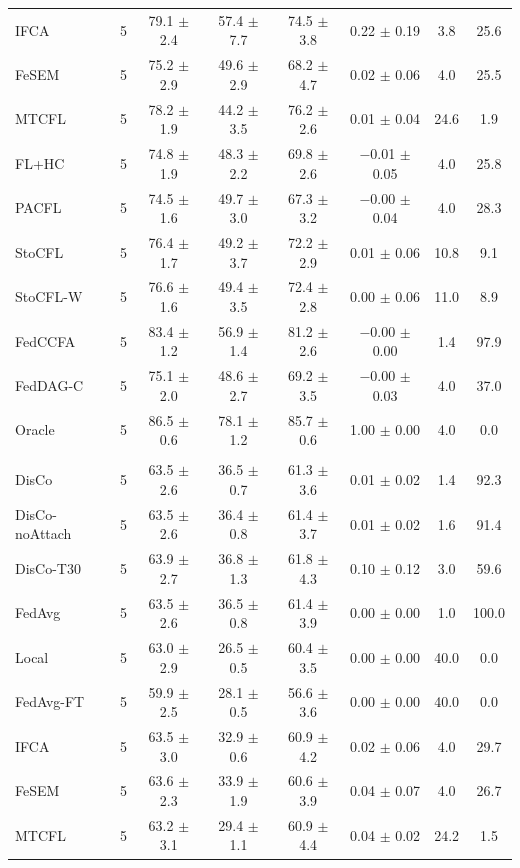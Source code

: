 {{\begin{tabular}{l r c c c c c c}
IFCA & 5 & 79.1 $\pm$ 2.4 & 57.4 $\pm$ 7.7 & 74.5 $\pm$ 3.8 & 0.22 $\pm$ 0.19 & 3.8 & 25.6 \\
FeSEM & 5 & 75.2 $\pm$ 2.9 & 49.6 $\pm$ 2.9 & 68.2 $\pm$ 4.7 & 0.02 $\pm$ 0.06 & 4.0 & 25.5 \\
MTCFL & 5 & 78.2 $\pm$ 1.9 & 44.2 $\pm$ 3.5 & 76.2 $\pm$ 2.6 & 0.01 $\pm$ 0.04 & 24.6 & 1.9 \\
FL+HC & 5 & 74.8 $\pm$ 1.9 & 48.3 $\pm$ 2.2 & 69.8 $\pm$ 2.6 & $-$0.01 $\pm$ 0.05 & 4.0 & 25.8 \\
PACFL & 5 & 74.5 $\pm$ 1.6 & 49.7 $\pm$ 3.0 & 67.3 $\pm$ 3.2 & $-$0.00 $\pm$ 0.04 & 4.0 & 28.3 \\
StoCFL & 5 & 76.4 $\pm$ 1.7 & 49.2 $\pm$ 3.7 & 72.2 $\pm$ 2.9 & 0.01 $\pm$ 0.06 & 10.8 & 9.1 \\
StoCFL-W & 5 & 76.6 $\pm$ 1.6 & 49.4 $\pm$ 3.5 & 72.4 $\pm$ 2.8 & 0.00 $\pm$ 0.06 & 11.0 & 8.9 \\
FedCCFA & 5 & 83.4 $\pm$ 1.2 & 56.9 $\pm$ 1.4 & 81.2 $\pm$ 2.6 & $-$0.00 $\pm$ 0.00 & 1.4 & 97.9 \\
FedDAG-C & 5 & 75.1 $\pm$ 2.0 & 48.6 $\pm$ 2.7 & 69.2 $\pm$ 3.5 & $-$0.00 $\pm$ 0.03 & 4.0 & 37.0 \\
Oracle & 5 & 86.5 $\pm$ 0.6 & 78.1 $\pm$ 1.2 & 85.7 $\pm$ 0.6 & 1.00 $\pm$ 0.00 & 4.0 & 0.0 \\
\addlinespace
\multicolumn{8}{l}{\textit{CIFAR-10 rotation}} \\
DisCo & 5 & 63.5 $\pm$ 2.6 & 36.5 $\pm$ 0.7 & 61.3 $\pm$ 3.6 & 0.01 $\pm$ 0.02 & 1.4 & 92.3 \\
DisCo-noAttach & 5 & 63.5 $\pm$ 2.6 & 36.4 $\pm$ 0.8 & 61.4 $\pm$ 3.7 & 0.01 $\pm$ 0.02 & 1.6 & 91.4 \\
DisCo-T30 & 5 & 63.9 $\pm$ 2.7 & 36.8 $\pm$ 1.3 & 61.8 $\pm$ 4.3 & 0.10 $\pm$ 0.12 & 3.0 & 59.6 \\
FedAvg & 5 & 63.5 $\pm$ 2.6 & 36.5 $\pm$ 0.8 & 61.4 $\pm$ 3.9 & 0.00 $\pm$ 0.00 & 1.0 & 100.0 \\
Local & 5 & 63.0 $\pm$ 2.9 & 26.5 $\pm$ 0.5 & 60.4 $\pm$ 3.5 & 0.00 $\pm$ 0.00 & 40.0 & 0.0 \\
FedAvg-FT & 5 & 59.9 $\pm$ 2.5 & 28.1 $\pm$ 0.5 & 56.6 $\pm$ 3.6 & 0.00 $\pm$ 0.00 & 40.0 & 0.0 \\
IFCA & 5 & 63.5 $\pm$ 3.0 & 32.9 $\pm$ 0.6 & 60.9 $\pm$ 4.2 & 0.02 $\pm$ 0.06 & 4.0 & 29.7 \\
FeSEM & 5 & 63.6 $\pm$ 2.3 & 33.9 $\pm$ 1.9 & 60.6 $\pm$ 3.9 & 0.04 $\pm$ 0.07 & 4.0 & 26.7 \\
MTCFL & 5 & 63.2 $\pm$ 3.1 & 29.4 $\pm$ 1.1 & 60.9 $\pm$ 4.4 & 0.04 $\pm$ 0.02 & 24.2 & 1.5 \\

\end{tabular}}}
